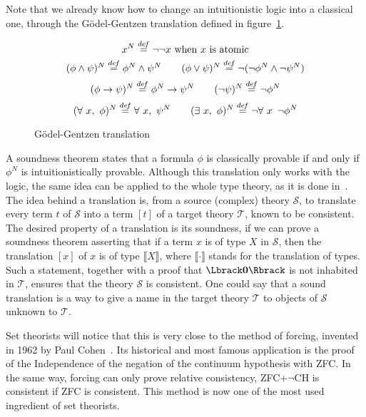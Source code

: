 Note that we already know how to change an intuitionistic logic into a
classical one, through the Gödel-Gentzen translation defined in
figure~\ref{fig:GG-trans}.
\begin{figure}[ht]
  \centering

  \[x^N \overset{de\hspace{-0.2ex}f}{=} \lnot\lnot x\text{ when $x$ is atomic}\]
  \[(\phi \land \psi)^N \overset{de\hspace{-0.2ex}f}{=} \phi^N \land \psi^N \qquad
  (\phi\lor \psi)^N \overset{de\hspace{-0.2ex}f}{=} \lnot (\lnot\phi^N \land \lnot \psi^N)\]
  \[(\phi \to \psi)^N \overset{de\hspace{-0.2ex}f}{=} \phi^N \to \psi^N \qquad
    (\lnot \psi)^N \overset{de\hspace{-0.2ex}f}{=} \lnot \phi^N\]
  \[(\forall\ x,\ \phi)^N \defeq \forall\ x,\ \psi^N \qquad
  (\exists\ x,\ \phi)^N \defeq \lnot\forall\ x\,\ \lnot\phi^N\]
  \caption{Gödel-Gentzen translation}
  \label{fig:GG-trans}
\end{figure}
A soundness theorem states that a formula $\phi$ is classically
provable if and only if $\phi^N$ is intuitionistically
provable. Although this translation only works with the logic, the
same idea can be applied to the whole type theory, as it is done
in~\cite{jaber2012extending,forcing2016}. The idea behind a
translation is, from a source (complex) theory $\mathcal S$, to translate every
term $t$ of $\mathcal S$ into a term $[t]$ of a target theory
$\mathcal T$, known to be consistent. The desired property of a
translation is its soundness, \ie{} if we can prove a
soundness theorem asserting that if a term $x$ is of type $X$ in
$\mathcal S$, then the translation $[x]$ of $x$ is of type $\Lbrack
X\Rbrack$, where $\Lbrack\cdot\Rbrack$ stands for the translation of
types. Such a statement, together with a proof that $\Lbrack \zero
\Rbrack$ is not inhabited in $\mathcal T$, ensures that the theory
$\mathcal S$ is consistent. 
One could say that a sound translation is a way to give a name in the
target theory $\mathcal T$ to objects of $\mathcal S$ unknown to
$\mathcal T$.

Set theorists will notice that this is very close to the method of
forcing, invented in 1962 by Paul Cohen~\cite{cohen1966}. Its
historical and most famous application is the proof of the
Independence of the negation of the continuum hypothesis with ZFC.
In the same way, forcing can only prove relative consistency, \eg{}
ZFC+$\lnot$CH is consistent if ZFC is consistent. This method is now
one of the most used ingredient of set theorists.

